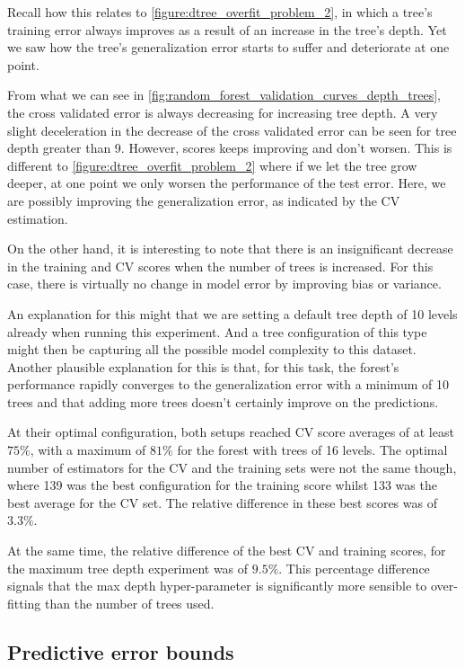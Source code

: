 Recall how this relates to \cref{figure:dtree_overfit_problem_2}, in which a tree's training error always improves as a result of an increase in the tree's depth.
Yet we saw how the tree's generalization error starts to suffer and deteriorate at one point.

From what we can see in \cref{fig:random_forest_validation_curves_depth_trees}, the cross validated error is always decreasing for increasing tree depth.
A very slight deceleration in the decrease of the cross validated error can be seen for tree depth greater than 9.
However, scores keeps improving and don't worsen.
This is different to \cref{figure:dtree_overfit_problem_2} where if we let the tree grow deeper, at one point we only worsen the performance of the test error.
Here, we are possibly improving the generalization error, as indicated by the CV estimation.

 On the other hand, it is interesting to note that there is an insignificant decrease in the training and CV scores when the number of trees is increased.
For this case, there is virtually no change in model error by improving bias or variance.

An explanation for this might that we are setting a default tree depth of 10 levels already when running this experiment.
And a tree configuration of this type might then be capturing all the possible model complexity to this dataset.
Another plausible explanation for this is that, for this task, the forest's performance rapidly converges to the generalization error with a minimum of 10 trees and that adding more trees doesn't certainly improve on the predictions.

At their optimal configuration, both setups reached CV score averages of at least $75\%$, with a maximum of $81\%$ for the forest
with trees of 16 levels.
The optimal number of estimators for the CV and the training sets were not the same though, where 139 was the best configuration for the training score whilst 133 was the best average for the CV set.
The relative difference in these best scores was of $3.3\%$.

At the same time, the relative difference of the best CV and training scores, for the maximum tree depth experiment was of $9.5\%$.
This percentage difference signals that the max depth hyper-parameter is significantly more sensible to over-fitting than the number of trees used.


\subsection{Predictive error bounds}\label{subsec:rforest_predictive_error_bounds}

